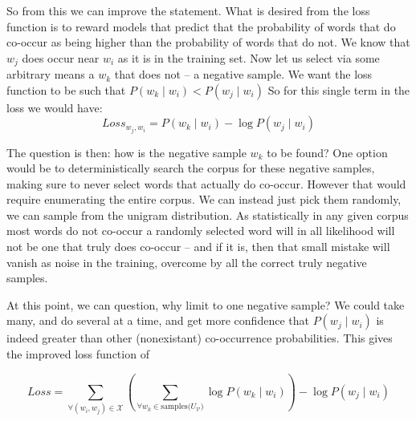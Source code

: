 \documentclass[parskip]{komatufte}
\begin{document}
So from this we can improve the statement.
What is desired from the loss function is to reward models that predict that  the probability of words that do co-occur as being higher than the probability of words that do not.
We know that $w_j$ does occur near $w_i$ as it is in the training set.
Now let us select via some arbitrary means a $w_k$ that does not -- a negative sample.
We want the loss function to be such that $P(w_k\mid w_i) < P(w_j\mid w_i)$
So for this single term in the loss we would have:
\begin{equation}
Loss_{w_j,w_i} =  P(w_k\mid w_i) - \log P(w_j\mid w_i)
\end{equation}



The question is then: how is the negative sample $w_k$ to be found?
One option would be to deterministically search the corpus for these negative samples, making sure to never select words that actually do co-occur.
However that would require enumerating the entire corpus.
We can instead just pick them randomly, we can sample from the unigram distribution.
As statistically in any given corpus most words do not co-occur 
a randomly selected word will in all likelihood will not be one that truly does co-occur
-- and if it is, then that small mistake will vanish as noise in the training,
overcome by all the correct truly negative samples.


At this point, we can question, why limit to one negative sample?
We could take many, and do several at a time,
and get more confidence that $P(w_j\mid w_i)$ is indeed greater than other (nonexistant) co-occurrence probabilities.
This gives the improved loss function of 

\begin{equation}
Loss = \sum_{\forall (w_i,w_j)\in \mathcal{X}} 
\left(\sum_{\forall w_k \in \text{samples($U_{\mathcal{V}}$)}}
 \log P(w_k\mid w_i) \right) 
 -\log P(w_j\mid w_i)
\end{equation}
\end{document}
